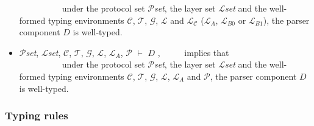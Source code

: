 \documentclass{article}
\begin{document}
\begin{itemize}
  ~~~~~~~~~~under the protocol set $\mathcal{P}$\textit{set}, the layer set $\mathcal{L}$\textit{set} and the well-formed typing environments $\mathcal{C}$, $\mathcal{T}$, $\mathcal{G}$, $\mathcal{L}$ and $\mathcal{L_{C}}$ ($\mathcal{L}_{A}$, $\mathcal{L}_{B0}$ or $\mathcal{L}_{B1}$), the parser component $D$ is well-typed.
  \item $\mathcal{P}$\textit{set}, $\mathcal{L}$\textit{set}, $\mathcal{C}$, $\mathcal{T}$, $\mathcal{G}$, $\mathcal{L}$, $\mathcal{L}_{A}$, $\mathcal{P}$ $\vdash$ $D$ , ~~~~~implies that \\
  ~~~~~~~~~~under the protocol set $\mathcal{P}$\textit{set}, the layer set $\mathcal{L}$\textit{set} and the well-formed typing environments $\mathcal{C}$, $\mathcal{T}$, $\mathcal{G}$, $\mathcal{L}$, $\mathcal{L}_{A}$ and $\mathcal{P}$, the parser component $D$ is well-typed.
  \end{itemize}


\subsubsection{Typing rules}
\end{document}
